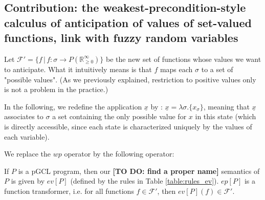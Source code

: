 \documentclass[a4paper,10pt]{llncs}
\def\RRposi {{\mathbb R_{\geq 0}^{\infty}}}
\newcommand\todo[1]{{\color{red}\textbf{[TO DO:  #1]}}}
\begin{document}

\subsection{Contribution: the weakest-precondition-style calculus of anticipation of values of set-valued functions, link with fuzzy random variables}
Let $\mathcal{F}' = \{f \,|\, f : \sigma \rightarrow P(\RRposi) \}$ be the new set of functions whose values we want to anticipate. What it intuitively means is that $f$ maps each $\sigma$ to a set of "possible values". (As we previously explained, restriction to positive values only is not a problem in the practice.)
\begin{example}
In the following, we redefine the application $\underline{x}$ by : $\underline{x} = \lambda\sigma. \{x_\sigma\}$, meaning that $\underline{x}$ associates to $\sigma$ a set containing the only possible value for $x$ in this state (which is directly accessible, since each state is characterized uniquely by the values of each variable).
\end{example}

We replace the $wp$ operator by the following operator:
\begin{definition}
 	If $P$ is a pGCL program, then our \todo{find a proper name} semantics of $P$ is given by $ev[P]$ (defined by the rules in Table \ref{table:rules_ev}).\newline
	$ep[P]$ is a function transformer, i.e. for all functions $f \in \mathcal{F}'$, then $ev[P](f) \in \mathcal{F}'$.
\end{definition}
\end{document}
